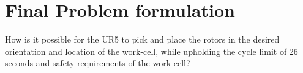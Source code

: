 \chapter{Final Problem formulation} \label{ch:finalprob}
 
 
 How is it possible for the UR5 to pick and place the rotors in the desired orientation and location of the work-cell, while upholding the cycle limit of 26 seconds and safety requirements of the work-cell? 
 
 
 